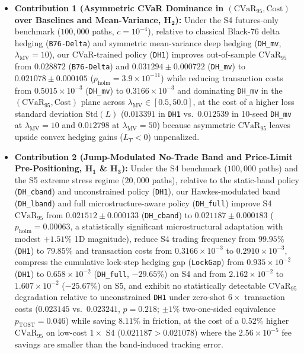 \documentclass[11pt,a4paper]{article}
\begin{document}
\begin{itemize}
  \item \textbf{Contribution 1 (Asymmetric CVaR Dominance in $(\text{CVaR}_{95}, \text{Cost})$ over Baselines and Mean-Variance, $\mathbf{H_2}$):}
  Under the S4 futures-only benchmark ($100,000$ paths, $c = 10^{-4}$), relative to classical Black-76 delta hedging (\texttt{B76-Delta}) and symmetric mean-variance deep hedging (\texttt{DH\_mv}, $\lambda_{\text{MV}}=10$), our CVaR-trained policy (\texttt{DH1}) improves out-of-sample $\text{CVaR}_{95}$ from $0.028872$ (\texttt{B76-Delta}) and $0.031294 \pm 0.000722$ (\texttt{DH\_mv}) to $0.021078 \pm 0.000105$ ($p_{\text{holm}} = 3.9 \times 10^{-11}$) while reducing transaction costs from $0.5015 \times 10^{-3}$ (\texttt{DH\_mv}) to $0.3166 \times 10^{-3}$ and dominating \texttt{DH\_mv} in the $(\text{CVaR}_{95}, \text{Cost})$ plane across $\lambda_{\text{MV}} \in [0.5, 50.0]$, at the cost of a higher loss standard deviation $\text{Std}(L)$ ($0.013391$ in \texttt{DH1} vs.\ $0.012539$ in 10-seed \texttt{DH\_mv} at $\lambda_{\text{MV}}=10$ and $0.012798$ at $\lambda_{\text{MV}}=50$) because asymmetric $\text{CVaR}_{95}$ leaves upside convex hedging gains ($L_T < 0$) unpenalized.

  \item \textbf{Contribution 2 (Jump-Modulated No-Trade Band and Price-Limit Pre-Positioning, $\mathbf{H_1}$ \& $\mathbf{H_3}$):}
  Under the S4 benchmark ($100,000$ paths) and the S5 extreme stress regime ($20,000$ paths), relative to the static-band policy (\texttt{DH\_cband}) and unconstrained policy (\texttt{DH1}), our Hawkes-modulated band (\texttt{DH\_lband}) and full microstructure-aware policy (\texttt{DH\_full}) improve S4 $\text{CVaR}_{95}$ from $0.021512 \pm 0.000133$ (\texttt{DH\_cband}) to $0.021187 \pm 0.000183$ ($p_{\text{holm}} = 0.00063$, a statistically significant microstructural adaptation with modest $+1.51\%$ 1D magnitude), reduce S4 trading frequency from $99.95\%$ (\texttt{DH1}) to $79.85\%$ and transaction costs from $0.3166 \times 10^{-3}$ to $0.2910 \times 10^{-3}$, compress the cumulative lock-step hedging gap (\texttt{LockGap}) from $0.935 \times 10^{-2}$ (\texttt{DH1}) to $0.658 \times 10^{-2}$ (\texttt{DH\_full}, $-29.65\%$) on S4 and from $2.162 \times 10^{-2}$ to $1.607 \times 10^{-2}$ ($-25.67\%$) on S5, and exhibit no statistically detectable $\text{CVaR}_{95}$ degradation relative to unconstrained \texttt{DH1} under zero-shot $6\times$ transaction costs ($0.023145$ vs.\ $0.023241$, $p = 0.218$; $\pm 1\%$ two-one-sided equivalence $p_{\text{TOST}} = 0.046$) while saving $8.11\%$ in friction, at the cost of a $0.52\%$ higher $\text{CVaR}_{95}$ on low-cost $1\times$ S4 ($0.021187 > 0.021078$) where the $2.56 \times 10^{-5}$ fee savings are smaller than the band-induced tracking error.


\end{itemize}
\end{document}

